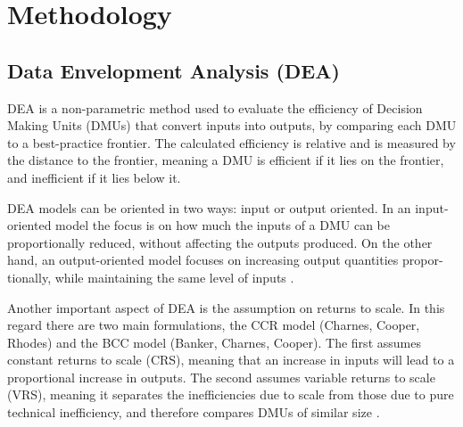 
\section{Methodology}
\label{sec:imple}
\subsection{Data Envelopment Analysis (DEA)}
\label{dea}
DEA is a non-parametric method used to evaluate the efficiency of Decision Making Units (DMUs) that convert inputs into outputs, by comparing each DMU to a best-practice frontier. The calculated efficiency is relative and is
measured by the distance to the frontier, meaning a DMU is efficient if it lies on the frontier, and inefficient if it lies below it. 

DEA models can be oriented in two ways: input or output oriented. In an input-oriented model the focus is on how much the inputs of a DMU can be proportionally reduced, without affecting the outputs
produced. On the other hand, an output-oriented model focuses on increasing output quantities propor-
tionally, while maintaining the same level of inputs \cite{charnes1994}. 

Another important aspect of DEA is the assumption on returns to scale. In this regard there are two
main formulations, the CCR model (Charnes, Cooper, Rhodes) and the BCC model (Banker, Charnes,
Cooper). The first assumes constant returns to scale (CRS), meaning that an increase in inputs will lead to a proportional increase in outputs. The second assumes variable returns to scale (VRS), meaning it separates the inefficiencies due to scale from those due to pure technical inefficiency, and therefore compares DMUs of similar size \cite{banker1984}. 

